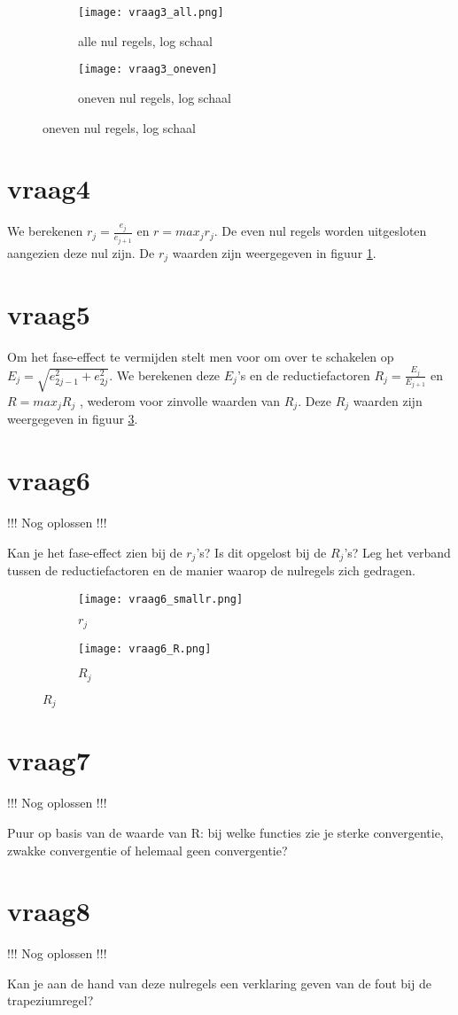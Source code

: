 \documentclass[11pt]{article} %
\begin{document}
\begin{figure}[H]
	\centering
	\begin{subfigure}[b]{0.45\textwidth}
		\texttt{[image: vraag3\_all.png]}
		\caption{alle nul regels, log schaal}
	\end{subfigure}
	\begin{subfigure}[b]{0.45\textwidth}
		\texttt{[image: vraag3\_oneven]}
		\caption{oneven nul regels, log schaal}
	\end{subfigure}
\end{figure}

\section{vraag4}
We berekenen $r_{j} = \frac{e_{j}}{e_{j+1}}$ en $r = max_{j} r_{j}$.
De even nul regels worden uitgesloten aangezien deze nul zijn. De $r_{j}$ waarden zijn weergegeven in figuur \ref{fig:oef6a}.
\section{vraag5}
Om het fase-effect te vermijden stelt men voor om over te schakelen op $E_{j} = \sqrt{e_{2j-1}^{2}+e_{2j}^{2}}$. We berekenen deze $E_{j}$’s en de reductiefactoren $R_{j} = \frac{E_{j}}{E_{j+1}}$ en $R = max_{j} R_{j}$ , wederom voor zinvolle waarden van $R_{j}$. Deze $R_{j}$ waarden zijn weergegeven in figuur \ref{fig:oef6b}.
\section{vraag6}
!!! Nog oplossen !!!


Kan je het fase-effect zien bij de $r_{j}$’s? Is dit
opgelost bij de $R_{j}$’s? Leg het verband tussen de reductiefactoren en de manier waarop de nulregels zich gedragen.

\begin{figure}[H]
	\centering
	\begin{subfigure}[b]{0.45\textwidth}
		\texttt{[image: vraag6\_smallr.png]}
		\caption{$r_j$}
		\label{fig:oef6a}
	\end{subfigure}
	\begin{subfigure}[b]{0.45\textwidth}
		\texttt{[image: vraag6\_R.png]}
		\caption{$R_j$}
		\label{fig:oef6b}
	\end{subfigure}
\end{figure}

\section{vraag7}
!!! Nog oplossen !!!


Puur op basis van de waarde van R: bij welke functies zie je sterke convergentie, zwakke convergentie of helemaal geen convergentie?

\section{vraag8}
!!! Nog oplossen !!!


Kan je aan de hand van deze nulregels een verklaring geven van de fout bij de trapeziumregel?
\end{document}
